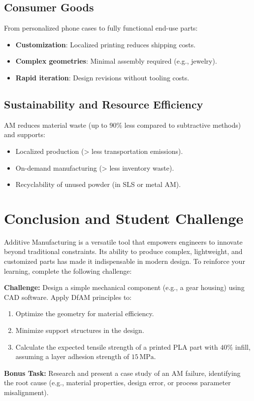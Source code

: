 \documentclass[12pt]{article}
\begin{document}
\subsection{Consumer Goods}
From personalized phone cases to fully functional end-use parts:
\begin{itemize}
    \item \textbf{Customization}: Localized printing reduces shipping costs.
    \item \textbf{Complex geometries}: Minimal assembly required (e.g., jewelry).
    \item \textbf{Rapid iteration}: Design revisions without tooling costs.
\end{itemize}

\subsection{Sustainability and Resource Efficiency}
AM reduces material waste (up to $90\%$ less compared to subtractive methods) and supports:
\begin{itemize}
    \item Localized production (> less transportation emissions).
    \item On-demand manufacturing (> less inventory waste).
    \item Recyclability of unused powder (in SLS or metal AM).
\end{itemize}

\section{Conclusion and Student Challenge}
Additive Manufacturing is a versatile tool that empowers engineers to innovate beyond traditional constraints. Its ability to produce complex, lightweight, and customized parts has made it indispensable in modern design. To reinforce your learning, complete the following challenge:

\textbf{Challenge:} Design a simple mechanical component (e.g., a gear housing) using CAD software. Apply DfAM principles to:
\begin{enumerate}
    \item Optimize the geometry for material efficiency.
    \item Minimize support structures in the design.
    \item Calculate the expected tensile strength of a printed PLA part with $40\%$ infill, assuming a layer adhesion strength of $15\,\text{MPa}$.
\end{enumerate}

\textbf{Bonus Task:} Research and present a case study of an AM failure, identifying the root cause (e.g., material properties, design error, or process parameter misalignment).
\end{document}
